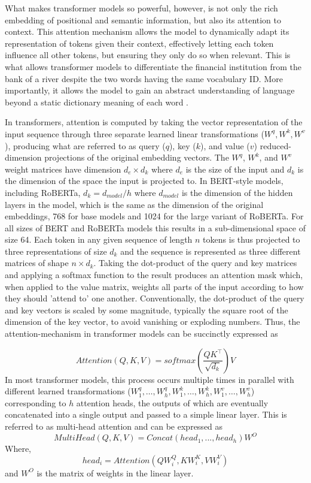 \documentclass[12pt]{report}
\begin{document}
What makes transformer models so powerful, however, is not only the rich embedding of positional and semantic information, but also its attention to context.
This attention mechanism allows the model to dynamically adapt its representation of tokens given their context, effectively letting each token influence all other tokens, but ensuring they only do so when relevant.
This is what allows transformer models to differentiate the financial institution from the bank of a river despite the two words having the same vocabulary ID.
More importantly, it allows the model to gain an abstract understanding of language beyond a static dictionary meaning of each word \cite{Vaswani2017}.

In transformers, attention is computed by taking the vector representation of the input sequence through three separate learned linear transformations ($W^q, W^k, W^v$), producing what are referred to as query ($q$), key ($k$), and value ($v$) reduced-dimension projections of the original embedding vectors.
The $W^q$, $W^k$, and $W^v$ weight matrices have dimension $d_e \times d_k$ where $d_e$ is the size of the input and $d_k$ is the dimension of the space the input is projected to.
In BERT-style models, including RoBERTa, $d_k = d_{model}/h$ where $d_{model}$ is the dimension of the hidden layers in the model, which is the same as the dimension of the original embeddings, 768 for base models and 1024 for the large variant of RoBERTa.
For all sizes of BERT and RoBERTa models this results in a sub-dimensional space of size 64.
Each token in any given sequence of length $n$ tokens is thus projected to three representations of size $d_k$ and the sequence is represented as three different matrices of shape $n \times d_k$.
Taking the dot-product of the query and key matrices and applying a softmax function to the result produces an attention mask which, when applied to the value matrix, weights all parts of the input according to how they should 'attend to' one another.
Conventionally, the dot-product of the query and key vectors is scaled by some magnitude, typically the square root of the dimension of the key vector, to avoid vanishing or exploding numbers.
Thus, the attention-mechanism in transformer models can be succinctly expressed as

$$Attention(Q,K,V) = softmax(\frac{QK^\intercal}{\sqrt{d_k}})V$$
In most transformer models, this process occurs multiple times in parallel with different learned transformations ($W_1^q, \ldots, W_h^q, W_1^k, \ldots, W_h^k, W_1^v, \ldots, W_h^v$) corresponding to $h$ attention heads, the outputs of which are eventually concatenated into a single output and passed to a simple linear layer.
This is referred to as multi-head attention and can be expressed as
$$MultiHead(Q, K, V) = Concat(head_1, ..., head_h)W^O$$
Where, $$head_i = Attention(Q W^Q_i, K W^K_i, V W^V_i)$$
and $W^O$ is the matrix of weights in the linear layer.
\end{document}
